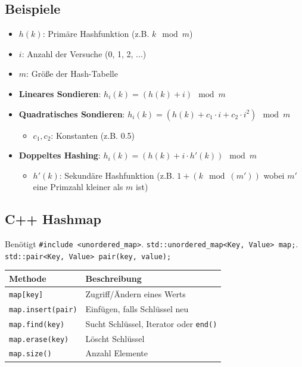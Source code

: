 \documentclass[10pt, a3paper, landscape]{article}
\newcommand{\formel}[1]{\ensuremath{#1}}
\newcommand{\datastruct}[1]{\textbf{\textcolor{red!60!black}{#1}}}
\begin{document}
\begin{multicols*}{4}
\begin{itemize}
\subsection*{Beispiele}

\begin{itemize}
    \item \formel{h(k)}: Primäre Hashfunktion (z.B. \formel{k \mod m})
    \item \formel{i}: Anzahl der Versuche (0, 1, 2, ...)
    \item \formel{m}: Größe der Hash-Tabelle
\end{itemize}

\noindent\hrulefill

\begin{itemize} 
\item \datastruct{Lineares Sondieren}: \formel{h_i(k) = (h(k) + i) \mod m}
\item \datastruct{Quadratisches Sondieren}: \formel{h_i(k) = (h(k) + c_1 \cdot i + c_2 \cdot i^2) \mod m}
\begin{itemize}
    \item \formel{c_1, c_2}: Konstanten (z.B. 0.5)
\end{itemize}
\item \datastruct{Doppeltes Hashing}: \formel{h_i(k) = (h(k) + i \cdot h'(k)) \mod m}

\begin{itemize}
    \item \formel{h'(k)}: Sekundäre Hashfunktion (z.B. \formel{1 + (k \mod (m'))} wobei \formel{m'} eine Primzahl kleiner als \formel{m} ist)
\end{itemize}
\end{itemize}

\subsection*{C++ Hashmap}
Benötigt \lstinline|#include <unordered_map>|. \lstinline|std::unordered_map<Key, Value> map;|. \lstinline|std::pair<Key, Value> pair(key, value);|

\noindent
\begin{tabularx}{\linewidth}{l >{\RaggedRight}X}
\toprule
\textbf{Methode} & \textbf{Beschreibung} \\
\midrule
\lstinline|map[key]| & Zugriff/Ändern eines Werts \\
\lstinline|map.insert(pair)| & Einfügen, falls Schlüssel neu \\
\lstinline|map.find(key)| & Sucht Schlüssel, Iterator oder \lstinline|end()| \\
\lstinline|map.erase(key)| & Löscht Schlüssel \\
\lstinline|map.size()| & Anzahl Elemente \\
\bottomrule
\end{tabularx}


\end{itemize}
\end{multicols*}
\end{document}
